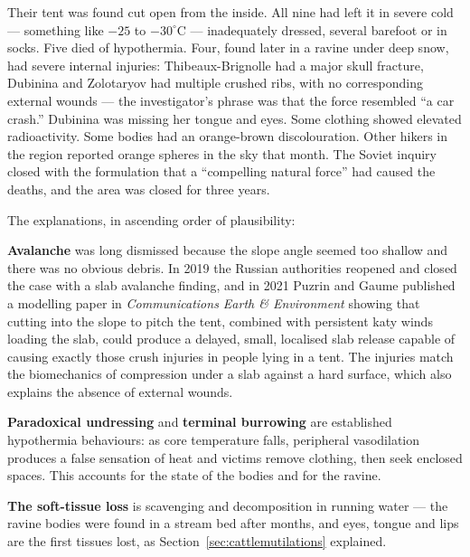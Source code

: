 %
Their tent was found cut open from the inside. All nine had left it in severe cold ---
something like $-25$ to $-30^\circ$C --- inadequately dressed, several barefoot or in socks. Five
died of hypothermia. Four, found later in a ravine under deep snow, had severe internal injuries:
Thibeaux-Brignolle had a major skull fracture, Dubinina and Zolotaryov had multiple crushed ribs,
with no corresponding external wounds --- the investigator's phrase was that the force resembled
``a car crash.'' Dubinina was missing her tongue and eyes. Some clothing showed elevated
radioactivity. Some bodies had an orange-brown discolouration. Other hikers in the region
reported orange spheres in the sky that month. The Soviet inquiry closed with the formulation
that a ``compelling natural force'' had caused the deaths, and the area was closed for three
years.

The explanations, in ascending order of plausibility:

\textbf{Avalanche} was long dismissed because the slope angle seemed too shallow and there was no
obvious debris. In 2019 the Russian authorities reopened and closed the case with a slab avalanche
finding, and in 2021 Puzrin and Gaume published a modelling paper in \emph{Communications Earth
\& Environment} showing that cutting into the slope to pitch the tent, combined with persistent
katy winds loading the slab, could produce a delayed, small, localised slab release capable of
causing exactly those crush injuries in people lying in a tent. The injuries match the biomechanics
of compression under a slab against a hard surface, which also explains the absence of external
wounds.

\textbf{Paradoxical undressing} and \textbf{terminal burrowing} are established hypothermia
behaviours: as core temperature falls, peripheral vasodilation produces a false sensation of heat
and victims remove clothing, then seek enclosed spaces. This accounts for the state of the
bodies and for the ravine.

\textbf{The soft-tissue loss} is scavenging and decomposition in running water --- the ravine
bodies were found in a stream bed after months, and eyes, tongue and lips are the first tissues
lost, as Section~\ref{sec:cattlemutilations} explained.

